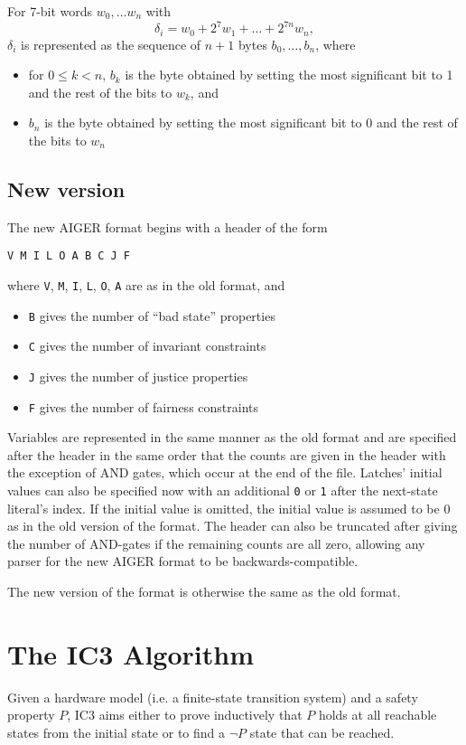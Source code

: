 \documentclass[12pt,a4paper,twoside,openright]{report}
\begin{document}
For 7-bit words $w_0, \ldots w_n$ with
$$\delta_i = w_0 + 2^7w_1 + \ldots + 2^{7n}w_n,$$
$\delta_i$ is represented as the sequence of $n + 1$ bytes
$b_0, \ldots, b_n$, where
\begin{itemize}
\item for $0 \leq k < n$, $b_k$ is the byte obtained by setting the most
significant bit to 1 and the rest of the bits to $w_k$, and
\item $b_n$ is the byte obtained by setting the most
significant bit to 0 and the rest of the bits to $w_n$
\end{itemize}


\subsection{New version}

The new AIGER format begins with a header of the form
\begin{verbatim}
V M I L O A B C J F
\end{verbatim}
where \verb,V,, \verb,M,, \verb,I,, \verb,L,, \verb,O,, \verb,A, are as
in the old format, and
\begin{itemize}
\item \verb,B, gives the number of ``bad state'' properties
\item \verb,C, gives the number of invariant constraints
\item \verb,J, gives the number of justice properties
\item \verb,F, gives the number of fairness constraints
\end{itemize}

Variables are represented in the same manner as the old format
and are specified after the header in the same order that the counts
are given in the header with the exception of AND gates, which
occur at the end of the file. Latches' initial values can also be specified
now with an additional \verb,0, or \verb,1, after the next-state literal's
index. If the initial value is omitted, the initial value is assumed to be
0 as in the old version of the format. The header can also be truncated
after giving the number of AND-gates if the remaining counts are all
zero, allowing any parser for the new AIGER format to be
backwards-compatible.

The new version of the format is otherwise
the same as the old format.

\section{The IC3 Algorithm}
Given a hardware model (i.e. a finite-state transition system) and a
safety property $P$, IC3 aims either to prove inductively that $P$ holds
at all reachable states from the initial state or
to find a $\neg P$ state that can be reached.
\end{document}
